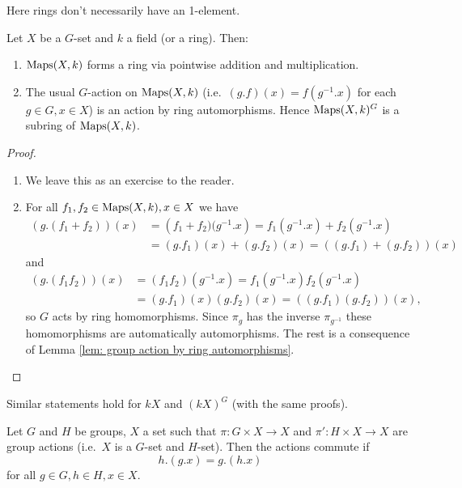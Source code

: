 \begin{rem}
 Here rings don't necessarily have an 1-element.
\end{rem}


\begin{expl}
 Let $X$ be a $G$-set and $k$ a field (or a ring). Then:
 \begin{enumerate}[label=\emph{\alph*)},leftmargin=*]
  \item
   $\operatorname{Maps}(X,k)$ forms a ring via pointwise addition and multiplication.
  \item
   The usual $G$-action on $\operatorname{Maps}(X,k)$ (i.e.\ $(g.f)(x) = f(g^{-1}.x)$ for each $g \in G, x \in X$) is an action by ring automorphisms. Hence $\operatorname{Maps}(X,k)^G$ is a subring of $\operatorname{Maps}(X,k)$.
 \end{enumerate}
 \begin{proof}
  \begin{enumerate}[label=\emph{\alph*)},leftmargin=*]
   \item
    We leave this as an exercise to the reader.
   \item
    For all $f_1, f_2 \in \operatorname{Maps}(X,k), x \in X$ we have
    \begin{align*}
     (g.(f_1+f_2))(x) &= \left(f_1+f_2)(g^{-1}.x\right) = f_1\left(g^{-1}.x\right) + f_2\left(g^{-1}.x\right) \\
     &= (g.f_1)(x) + (g.f_2)(x) = ((g.f_1)+(g.f_2))(x)
    \end{align*}
    and
    \begin{align*}
     (g.(f_1 f_2))(x) &= (f_1 f_2)\left(g^{-1}.x\right) = f_1\left(g^{-1}.x\right) f_2\left(g^{-1}.x\right) \\
     &= (g.f_1)(x) (g.f_2)(x) = ((g.f_1)(g.f_2))(x),
    \end{align*}
    so $G$ acts by ring homomorphisms. Since $\pi_g$ has the inverse $\pi_{g^{-1}}$ these homomorphisms are automatically automorphisms. The rest is a consequence of Lemma \ref{lem: group action by ring automorphisms}.
   \qedhere
  \end{enumerate}
 \end{proof}
\end{expl}


\begin{rem}
 Similar statements hold for $kX$ and $(kX)^G$ (with the same proofs).
\end{rem}


\begin{defi}
 Let $G$ and $H$ be groups, $X$ a set such that $\pi \colon G \times X \to X$ and $\pi' \colon H \times X \to X$ are group actions (i.e.\ $X$ is a $G$-set and $H$-set). Then the actions commute if
 \[
  h.(g.x) = g.(h.x)
 \]
 for all $g \in G, h \in H, x \in X$.
\end{defi}


